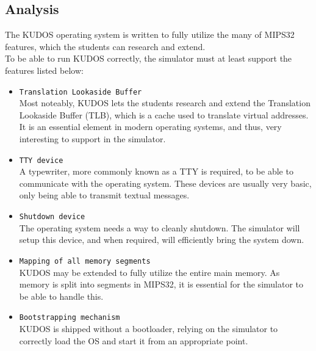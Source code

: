 \subsection{Analysis}
The KUDOS operating system is written to fully utilize the many of MIPS32 features,
which the students can research and extend.\\
To be able to run KUDOS correctly, the simulator must at least support the features
listed below:
\begin{itemize}
	\item \texttt{Translation Lookaside Buffer}\\
Most noteably, KUDOS lets the students research and extend the Translation
Lookaside Buffer (TLB), which is a cache used to translate virtual addresses\cite{COD5}.
It is an essential element in modern operating systems, and thus, very
interesting to support in the simulator.

	\item \texttt{TTY device}\\
A typewriter, more commonly known as a TTY is required, to be able to communicate
with the operating system. These devices are usually very basic, only being able
to transmit textual messages.

	\item \texttt{Shutdown device}\\
The operating system needs a way to cleanly shutdown. The simulator will setup
this device, and when required, will efficiently bring the system down.

	\item \texttt{Mapping of all memory segments}\\
KUDOS may be extended to fully utilize the entire main memory. As memory is
split into segments in MIPS32, it is essential for the simulator to be able to
handle this.

	\item \texttt{Bootstrapping mechanism}\\
KUDOS is shipped without a bootloader, relying on the simulator to correctly
load the OS and start it from an appropriate point.
\end{itemize}



